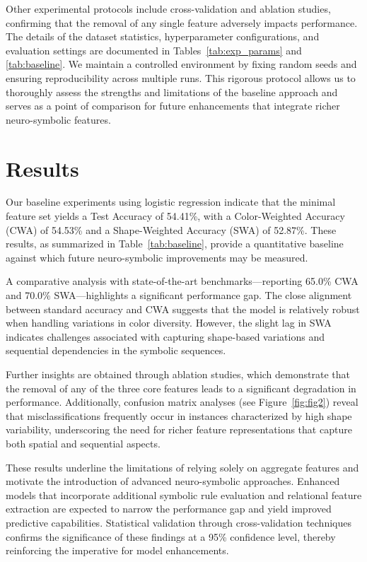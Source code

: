 \documentclass[11pt]{article}
\begin{document}
Other experimental protocols include cross-validation and ablation studies, confirming that the removal of any single feature adversely impacts performance. The details of the dataset statistics, hyperparameter configurations, and evaluation settings are documented in Tables~\ref{tab:exp_params} and \ref{tab:baseline}. We maintain a controlled environment by fixing random seeds and ensuring reproducibility across multiple runs. This rigorous protocol allows us to thoroughly assess the strengths and limitations of the baseline approach and serves as a point of comparison for future enhancements that integrate richer neuro-symbolic features.

\section{Results}
Our baseline experiments using logistic regression indicate that the minimal feature set yields a Test Accuracy of 54.41\%, with a Color-Weighted Accuracy (CWA) of 54.53\% and a Shape-Weighted Accuracy (SWA) of 52.87\%. These results, as summarized in Table~\ref{tab:baseline}, provide a quantitative baseline against which future neuro-symbolic improvements may be measured.

A comparative analysis with state-of-the-art benchmarks—reporting 65.0\% CWA and 70.0\% SWA—highlights a significant performance gap. The close alignment between standard accuracy and CWA suggests that the model is relatively robust when handling variations in color diversity. However, the slight lag in SWA indicates challenges associated with capturing shape-based variations and sequential dependencies in the symbolic sequences.

Further insights are obtained through ablation studies, which demonstrate that the removal of any of the three core features leads to a significant degradation in performance. Additionally, confusion matrix analyses (see Figure~\ref{fig:fig2}) reveal that misclassifications frequently occur in instances characterized by high shape variability, underscoring the need for richer feature representations that capture both spatial and sequential aspects.

These results underline the limitations of relying solely on aggregate features and motivate the introduction of advanced neuro-symbolic approaches. Enhanced models that incorporate additional symbolic rule evaluation and relational feature extraction are expected to narrow the performance gap and yield improved predictive capabilities. Statistical validation through cross-validation techniques confirms the significance of these findings at a 95\% confidence level, thereby reinforcing the imperative for model enhancements.
\end{document}

